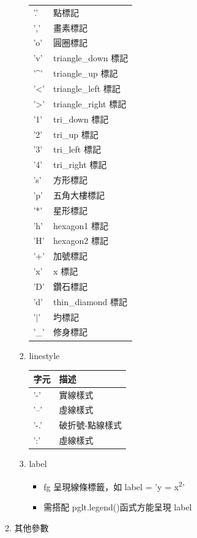 \documentclass[a4paper,12pt]{article}
\begin{document}
\begin{enumerate}
\begin{enumerate}
\begin{enumerate}
\begin{center}
\begin{tabular}{ll}
\hline
'.' & 點標記\\
',' & 畫素標記\\
'o' & 圓圈標記\\
'v' & triangle\_down 標記\\
'\^{}' & triangle\_up 標記\\
'<' & triangle\_left 標記\\
'>' & triangle\_right 標記\\
'1' & tri\_down 標記\\
'2' & tri\_up 標記\\
'3' & tri\_left 標記\\
'4' & tri\_right 標記\\
's' & 方形標記\\
'p' & 五角大樓標記\\
'*' & 星形標記\\
'h' & hexagon1 標記\\
'H' & hexagon2 標記\\
'+' & 加號標記\\
'x' & x 標記\\
'D' & 鑽石標記\\
'd' & thin\_diamond 標記\\
'\(\vert{}\)' & 圴標記\\
'\_' & 修身標記\\
\end{tabular}
\end{center}
\item linestyle
\label{sec:org3b2397d}
\begin{center}
\begin{tabular}{ll}
字元 & 描述\\
\hline
'-' & 實線樣式\\
'--' & 虛線樣式\\
'-.' & 破折號-點線樣式\\
':' & 虛線樣式\\
\end{tabular}
\end{center}
\item label
\label{sec:org1fbd49c}
\begin{itemize}
\item fg 呈現線條標籤，如 label = 'y = x\textsuperscript{2}'\\
\item 需搭配 pglt.legend()函式方能呈現 label\\
\end{itemize}
\end{enumerate}
\item 其他參數

\end{enumerate}
\end{enumerate}
\end{document}
